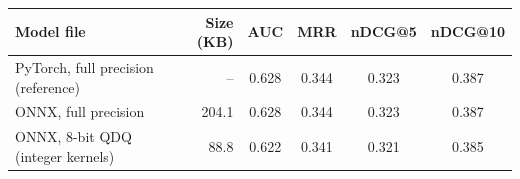 \begin{tabular}{lrcccc}
\toprule
Model file & Size (KB) & AUC & MRR & nDCG@5 & nDCG@10\\
\midrule
PyTorch, full precision (reference) & -- & 0.628 & 0.344 & 0.323 & 0.387\\
ONNX, full precision & 204.1 & 0.628 & 0.344 & 0.323 & 0.387\\
ONNX, 8-bit QDQ (integer kernels) & 88.8 & 0.622 & 0.341 & 0.321 & 0.385\\
\bottomrule
\end{tabular}
